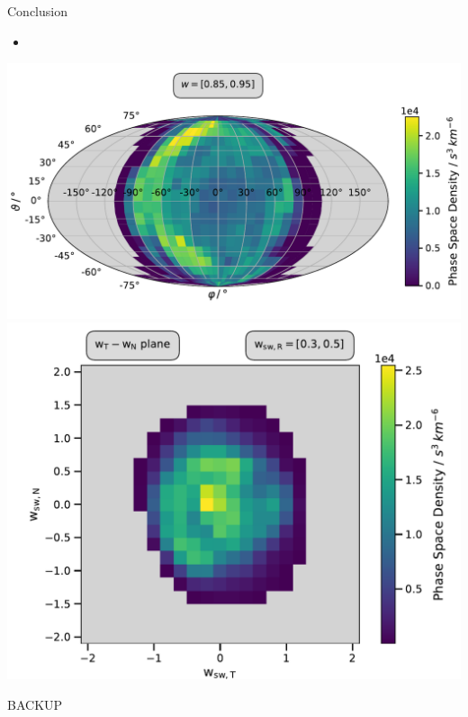 \documentclass{beamer}
\begin{document}
\begin{frame}[plain]{Conclusion}
\begin{itemize}
	\item 
\end{itemize}
	\includegraphics[scale=.21]{Pics/sky_ps.pdf}
	\includegraphics[scale=.25]{Pics/cart_50_ps_R.pdf}
\end{frame}


\begin{frame}[plain]{}
\begin{center}
	{\Huge BACKUP}
\end{center}
\end{frame}
\end{document}
